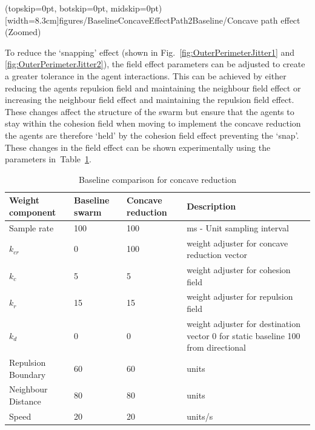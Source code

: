 \documentclass{ieeeaccess}
\begin{document}
\Figure[t!](topskip=0pt, botskip=0pt, midskip=0pt)[width=8.3cm]{figures/BaselineConcaveEffectPath2}{Baseline/Concave path effect (Zoomed)\label{concave:BaselineConcaveEffectPath2}}

To reduce the `snapping' effect (shown in Fig.~\ref{fig:OuterPerimeterJitter1} and \ref{fig:OuterPerimeterJitter2}), the field effect parameters can be adjusted to create a greater tolerance in the agent interactions. This can be achieved by either reducing the agents repulsion field and maintaining the neighbour field effect or increasing the neighbour field effect and maintaining the repulsion field effect. These changes affect the structure of the swarm but ensure that the agents to stay within the cohesion field when moving to implement the concave reduction the agents are therefore `held' by the cohesion field effect preventing the `snap'. These changes in the field effect can be shown experimentally using the parameters in~Table~\ref{tab:BaselineConcaveReduction2}. 

\begin{table}
\caption{Baseline comparison for concave reduction} 
\label{tab:BaselineConcaveReduction2}
\begin{center}
\begin{tabular}{| p{1.4cm} | p{1.2cm} | p{1.2cm} | p{2.5cm} |}
\hline
\bf Weight \bf component & \bf Baseline \bf swarm & \bf Concave \bf reduction & \bf Description \\ \hline
Sample rate & 100 & 100 & ms - Unit sampling interval\\  \hline
$k_{cr}$ & 0 & 100 & weight adjuster for concave reduction vector\\  \hline
$k_c$ & 5 & 5 & weight adjuster for cohesion field\\  \hline
$k_r$ & 15 & 15 & weight adjuster for repulsion field\\  \hline
$k_d$ & 0 & 0 & weight adjuster for destination vector 0 for static baseline 100 from directional\\  \hline
Repulsion Boundary & 60 & 60 & units\\  \hline
Neighbour Distance & 80 & 80 & units\\  \hline
Speed & 20 & 20 & units/s\\  \hline
\end{tabular}
\end{center}
\end{table}
\end{document}
